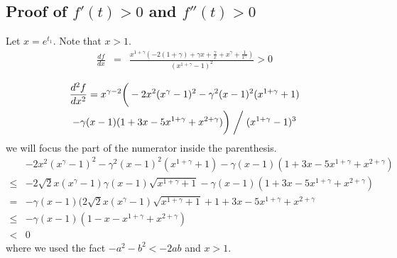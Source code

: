 \documentclass[review,authoryear]{elsarticle}
\begin{document}
\subsection*{Proof of $f'(t)>0$ and $f''(t)>0$ }

Let $x=e^{t_{1}}$. Note that $x>1$. 
\begin{eqnarray*}
\frac{df}{dx} & = & \frac{x^{1+\gamma}(-2(1+\gamma)+\gamma x+\frac{\gamma}{x}+x^{\gamma}+\frac{1}{x^{\gamma}})}{(x^{1+\gamma}-1)^{2}}>0\\
\end{eqnarray*}
\begin{multline*}
\frac{d^{2}f}{dx^{2}}  =   x^{\gamma-2}\bigg(  -2x^{2}(x^{\gamma}-1)^{2}-\gamma^{2}(x-1)^{2}(x^{1+\gamma}+1)\\-\gamma(x-1)(1+3x-5x^{1+\gamma}+x^{2+\gamma}) \bigg)  \biggm/ (x^{1+\gamma}-1)^{3}
\end{multline*}
we will focus the part of the numerator inside the parenthesis. 
\begin{align*}
 & -2x^{2}(x^{\gamma}-1)^{2}-\gamma^{2}(x-1)^{2}(x^{1+\gamma}+1)-\gamma(x-1)(1+3x-5x^{1+\gamma}+x^{2+\gamma})\\
\le & -2\sqrt{2}x(x^{\gamma}-1)\gamma(x-1)\sqrt{x^{1+\gamma}+1}-\gamma(x-1)(1+3x-5x^{1+\gamma}+x^{2+\gamma})\\
= & -\gamma(x-1)(2\sqrt{2}x(x^{\gamma}-1)\sqrt{x^{1+\gamma}+1}+1+3x-5x^{1+\gamma}+x^{2+\gamma}\\
\le & -\gamma(x-1)(1-x-x^{1+\gamma}+x^{2+\gamma})\\
< & 0
\end{align*}
where we used the fact $-a^{2}-b^{2}<-2ab$ and $x>1$. 
\end{document}
